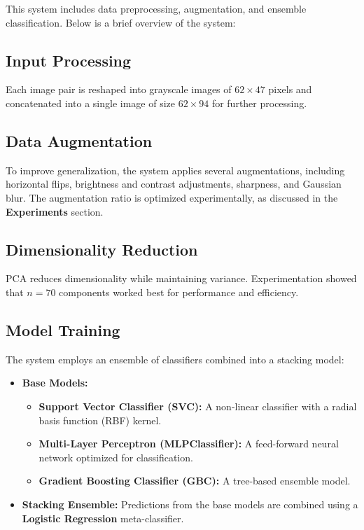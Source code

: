 \documentclass[a4paper]{article}
\begin{document}

This system includes data preprocessing, augmentation, and ensemble classification. Below is a brief overview of the system:

\subsection{Input Processing}
Each image pair is reshaped into grayscale images of $62 \times 47$ pixels and concatenated into a single image of size $62 \times 94$ for further processing.

\subsection{Data Augmentation}
To improve generalization, the system applies several augmentations, including horizontal flips, brightness and contrast adjustments, sharpness, and Gaussian blur. The augmentation ratio is optimized experimentally, as discussed in the \textbf{Experiments} section.

\subsection{Dimensionality Reduction}
PCA reduces dimensionality while maintaining variance. Experimentation showed that \(n=70\) components worked best for performance and efficiency.

\subsection{Model Training}
The system employs an ensemble of classifiers combined into a stacking model:
\begin{itemize}
    \item \textbf{Base Models:}
    \begin{itemize}
        \item \textbf{Support Vector Classifier (SVC):} A non-linear classifier with a radial basis function (RBF) kernel.
        \item \textbf{Multi-Layer Perceptron (MLPClassifier):} A feed-forward neural network optimized for classification.
        \item \textbf{Gradient Boosting Classifier (GBC):} A tree-based ensemble model.
    \end{itemize}
    \item \textbf{Stacking Ensemble\cite{aug02}:} Predictions from the base models are combined using a \textbf{Logistic Regression} meta-classifier.
\end{itemize}
\end{document}
